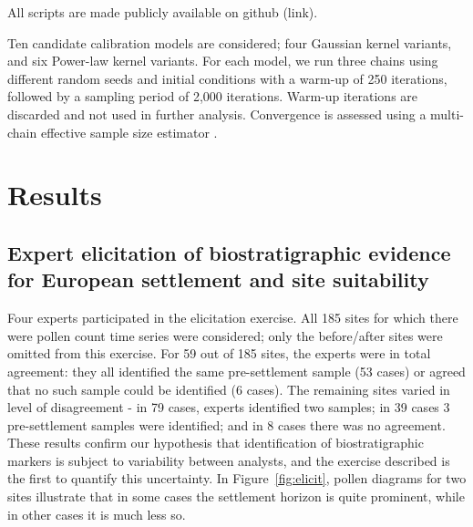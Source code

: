 \documentclass[12pt]{article}
\begin{document}
All scripts are made publicly available on github (link).

Ten candidate calibration models are considered; four Gaussian kernel
variants, and six Power-law kernel variants. For each model, we run
three chains using different random seeds and initial conditions with
a warm-up of 250 iterations, followed by a sampling period of 2,000
iterations. Warm-up iterations are discarded and not used in further
analysis. Convergence is assessed using a multi-chain effective sample
size estimator \citep{gelman2014bayesian, XXX}.




\section{Results}

\subsection{Expert elicitation of biostratigraphic evidence for European settlement and site suitability}

Four experts participated in the elicitation exercise. All 185 sites
for which there were pollen count time series were considered; only
the before/after sites were omitted from this exercise. For 59 out of
185 sites, the experts were in total agreement: they all identified
the same pre-settlement sample (53 cases) or agreed that no such
sample could be identified (6 cases). The remaining sites varied in
level of disagreement - in 79 cases, experts identified two samples;
in 39 cases 3 pre-settlement samples were identified; and in 8 cases
there was no agreement. These results confirm our hypothesis that
identification of biostratigraphic markers is subject to variability
between analysts, and the exercise described is the first to quantify
this uncertainty. In Figure~\ref{fig:elicit}, pollen diagrams for two
sites illustrate that in some cases the settlement horizon is quite
prominent, while in other cases it is much less so.
\end{document}
